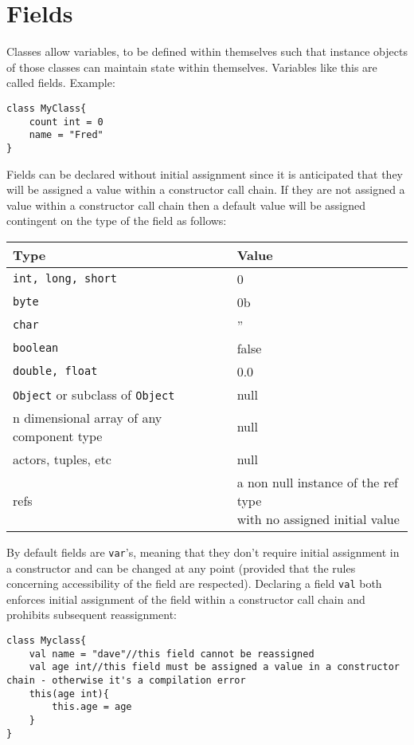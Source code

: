 \documentclass[conc-doc]{subfiles}
\begin{document}
\section{Fields}
Classes allow variables, to be defined within themselves such that instance objects of those classes can maintain state within themselves. Variables like this are called fields. Example:

\begin{lstlisting}
class MyClass{
	count int = 0
	name = "Fred"
}
\end{lstlisting}


Fields can be declared without initial assignment since it is anticipated that they will be assigned a value within a constructor call chain. If they are not assigned a value within a constructor call chain then a default value will be assigned contingent on the type of the field as follows:


\begin{table}[H]
	\centering
	\begin{tabular}{ll}
			\hline
			Type&Value\\
			\hline
			\lstinline!int, long, short!&0\\
			\lstinline!byte!&0b\\
			\lstinline!char!&''\\
			\lstinline!boolean!&false\\
			\lstinline!double, float!&0.0\\
			\lstinline!Object! or subclass of \lstinline!Object!&null\\
			n dimensional array of any component type&null\\
			actors, tuples, etc&null\\
			refs&\bettershortstack{a non null instance of the ref type\\with no assigned initial value}\\
			\hline
	\end{tabular}%
\end{table}


By default fields are \lstinline{var}'s, meaning that they don't require initial assignment in a constructor and can be changed at any point (provided that the rules concerning accessibility of the field are respected). Declaring a field \lstinline{val} both enforces initial assignment of the field within a constructor call chain and prohibits subsequent reassignment:

\begin{lstlisting}
class Myclass{
	val name = "dave"//this field cannot be reassigned
	val age int//this field must be assigned a value in a constructor chain - otherwise it's a compilation error
	this(age int){
		this.age = age
	}
}
\end{lstlisting}
\end{document}
